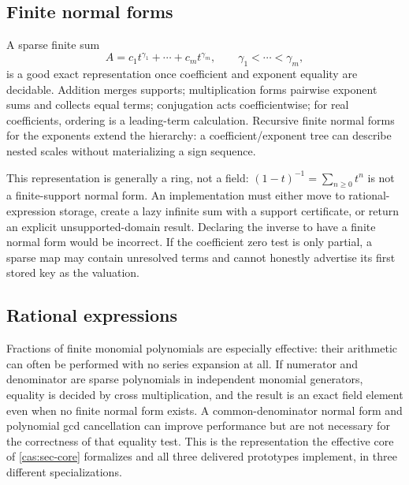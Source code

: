 \documentclass[11pt,letterpaper]{article}
\numberwithin{equation}{section}
\theoremstyle{definition}
\theoremstyle{remark}
\begin{document}
\subsection{Finite normal forms}
\label{cas:sub-finitenormal}
A sparse finite sum
\[
 A=c_1t^{\gamma_1}+\cdots+c_mt^{\gamma_m},\qquad \gamma_1<\cdots<\gamma_m,
\]
is a good exact representation once coefficient and exponent equality are
decidable. Addition merges supports; multiplication forms pairwise exponent sums
and collects equal terms; conjugation acts coefficientwise; for real
coefficients, ordering is a leading-term calculation. Recursive finite normal
forms for the exponents extend the hierarchy: a coefficient/exponent tree can
describe nested scales without materializing a sign sequence.

This representation is generally a ring, not a field:
$(1-t)^{-1}=\sum_{n\ge0}t^n$ is not a finite-support normal form. An
implementation must either move to rational-expression storage, create a lazy
infinite sum with a support certificate, or return an explicit
unsupported-domain result. Declaring the inverse to have a finite normal form
would be incorrect. If the coefficient zero test is only partial, a sparse map
may contain unresolved terms and cannot honestly advertise its first stored key
as the valuation.

\subsection{Rational expressions}
\label{cas:sub-rationalrep}
Fractions of finite monomial polynomials are especially effective: their
arithmetic can often be performed with no series expansion at all. If numerator
and denominator are sparse polynomials in independent monomial generators,
equality is decided by cross multiplication, and the result is an exact field
element even when no finite normal form exists. A common-denominator normal form
and polynomial gcd cancellation can improve performance but are not necessary
for the correctness of that equality test. This is the representation the
effective core of \cref{cas:sec-core} formalizes and all three delivered
prototypes implement, in three different specializations.
\end{document}
